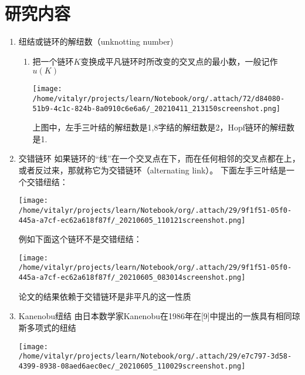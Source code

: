 \documentclass[bigger]{beamer}
\begin{document}
\section{研究内容}
\label{sec:orgb5e4fe2}
\begin{enumerate}
\item 纽结或链环的解纽数（unknotting number)
\label{sec:org1a841b3}
\begin{enumerate}
\item 把一个链环\(K\)变换成平凡链环时所改变的交叉点的最小数，一般记作\(u(K)\)
\label{sec:orgbe95834}
\begin{center}
\texttt{[image: /home/vitalyr/projects/learn/Notebook/org/.attach/72/d84080-51b9-4c1c-824b-8a0910c6e6a6/\_20210411\_213150screenshot.png]}
\end{center}

上图中，左手三叶结的解纽数是1,8字结的解纽数是2，Hopf链环的解纽数是1.
\end{enumerate}

\item 交错链环
\label{sec:orgad85ee7}
如果链环的“线”在一个交叉点在下，而在任何相邻的交叉点都在上，或者反过来，那就称它为交错链环（alternating link）。
下面左手三叶结是一个交错纽结：

\begin{center}
\texttt{[image: /home/vitalyr/projects/learn/Notebook/org/.attach/29/9f1f51-05f0-445a-a7cf-ec62a618f87f/\_20210605\_110121screenshot.png]}
\end{center}

例如下面这个链环不是交错纽结：
\begin{center}
\texttt{[image: /home/vitalyr/projects/learn/Notebook/org/.attach/29/9f1f51-05f0-445a-a7cf-ec62a618f87f/\_20210605\_083014screenshot.png]}
\end{center}
论文的结果依赖于交错链环是非平凡的这一性质
\item Kanenobu纽结
\label{sec:org8f31657}
由日本数学家Kanenobu在1986年在[9]中提出的一族具有相同琼斯多项式的纽结

\begin{center}
\texttt{[image: /home/vitalyr/projects/learn/Notebook/org/.attach/29/e7c797-3d58-4399-8938-08aed6aec0ec/\_20210605\_110029screenshot.png]}
\end{center}
\end{enumerate}
\end{document}
